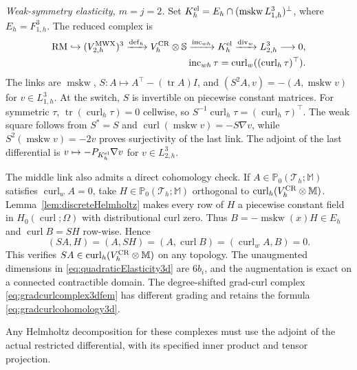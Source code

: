 \documentclass[10pt]{amsart}
\numberwithin{equation}{section}
\newcommand{\curl}{\operatorname{curl}}
\renewcommand{\div}{\operatorname{div}}
\newcommand{\tr}{\operatorname{tr}}
\newcommand{\mskw}{\operatorname{mskw}}
\newcommand{\defm}{\operatorname{def}}
\newcommand{\inc}{\operatorname{inc}}
\begin{document}
\smallskip\noindent\emph{Weak-symmetry elasticity, $m=j=2$.}
Set $K_h^{\rm el}=E_h\cap(\mskw L_{1,h}^3)^\perp$, where $E_h=F_{1,h}^3$.
The reduced complex is
\begin{equation}\label{eq:quadraticElasticity3d}
\begin{aligned}
{\rm RM}\hookrightarrow (V_{2,h}^{\rm MWX})^3
\xrightarrow{\defm_h}V_h^{\rm CR}\otimes\mathbb S
\xrightarrow{\inc_{wh}}K_h^{\rm el}
\xrightarrow{\div_w}L_{2,h}^3\longrightarrow0,\\
\inc_{wh}\tau=\curl_w((\curl_h\tau)^\top).
\end{aligned}
\end{equation}
The links are $\mskw$, $S:A\mapsto A^\top-(\tr A)I$, and
$(S^2A,v)=-(A,\mskw v)$ for $v\in L_{1,h}^3$.
At the switch, $S$ is invertible on piecewise constant matrices.
For symmetric $\tau$, $\tr(\curl_h\tau)=0$ cellwise, so
$S^{-1}\curl_h\tau=(\curl_h\tau)^\top$.
The weak square follows from $S^*=S$ and
$\curl(\mskw v)=-S\nabla v$, while $S^2(\mskw v)=-2v$
proves surjectivity of the last link.
The adjoint of the last differential is
$v\mapsto-P_{K_h^{\rm el}}\nabla v$ for $v\in L_{2,h}^3$.

The middle link also admits a direct cohomology check.
If $A\in\mathbb P_0(\mathcal T_h;\mathbb M)$ satisfies $\curl_wA=0$,
take $H\in\mathbb P_0(\mathcal T_h;\mathbb M)$ orthogonal to
$\curl_h(V_h^{\rm CR}\otimes\mathbb M)$.
Lemma~\ref{lem:discreteHelmholtz} makes every row of $H$ a piecewise constant field in
$H_0(\curl;\Omega)$ with distributional curl zero.
Thus $B=-\mskw(x)H\in E_h$ and $\curl B=SH$ row-wise. Hence
\[
(SA,H)=(A,SH)=(A,\curl B)=(\curl_wA,B)=0.
\]
This verifies $SA\in\curl_h(V_h^{\rm CR}\otimes\mathbb M)$ on any topology.
The unaugmented dimensions in \eqref{eq:quadraticElasticity3d} are $6b_i$,
and the augmentation is exact on a connected contractible domain.
The degree-shifted grad-curl complex \eqref{eq:gradcurlcomplex3dfem}
has different grading and retains the formula \eqref{eq:gradcurlcohomology3d}.

Any Helmholtz decomposition for these complexes must use the adjoint of
the actual restricted differential, with its specified inner product and
tensor projection.




\end{document}
